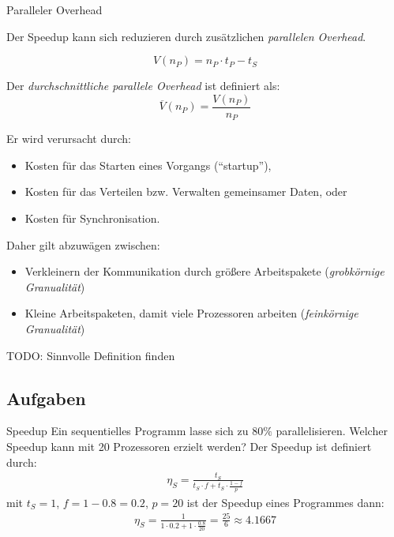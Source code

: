 \begin{defi}{Paralleler Overhead}
    
    Der Speedup kann sich reduzieren durch zusätzlichen \emph{parallelen Overhead}.
    
    \[
        V(n_P) = n_P \cdot t_P - t_S
    \]
    
    Der \emph{durchschnittliche parallele Overhead} ist definiert als:
    \[
        \overline{V}(n_P) = \frac{V(n_P)}{n_P}
    \]
    
    Er wird verursacht durch:
    \begin{itemize}
        \item Kosten für das Starten eines Vorgangs (\enquote{startup}),
        \item Kosten für das Verteilen bzw. Verwalten gemeinsamer Daten, oder
        \item Kosten für Synchronisation.
    \end{itemize}
    
    Daher gilt abzuwägen zwischen:
    \begin{itemize}
        \item Verkleinern der Kommunikation durch größere Arbeitspakete (\emph{grobkörnige Granualität})
        \item Kleine Arbeitspaketen, damit viele Prozessoren arbeiten (\emph{feinkörnige Granualität})
    \end{itemize}
    
    TODO: Sinnvolle Definition finden
\end{defi}

\subsection{Aufgaben}

\begin{aufgabe}{Speedup}
    Ein sequentielles Programm lasse sich zu $80\%$ parallelisieren. 
    Welcher Speedup kann mit 20 Prozessoren erzielt werden?
    \tcblower
    Der Speedup ist definiert durch: 
    \begin{align*}
        \eta_S = \frac{t_S}{t_S \cdot f + t_S \cdot \frac{1-f}{p}}
    \end{align*}
    mit $t_S=1$, $f=1-0.8=0.2$, $p=20$ ist der Speedup eines Programmes dann:
    \begin{align*}
        \eta_S = \frac{1}{1 \cdot 0.2 + 1 \cdot \frac{0.8}{20}} = \frac{25}{6} \approx 4.1667
    \end{align*}
\end{aufgabe}

